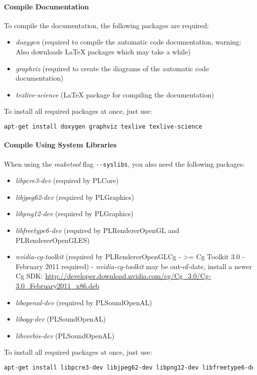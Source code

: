\paragraph{Compile Documentation}
To compile the documentation, the following packages are required:
\begin{itemize}
\item{\emph{doxygen} (required to compile the automatic code documentation, warning: Also downloads \LaTeX{} packages which may take a while)}
\item{\emph{graphviz} (required to create the diagrams of the automatic code documentation)}
\item{\emph{texlive-science} (\LaTeX{} package for compiling the documentation)}
\end{itemize}

To install all required packages at once, just use:
\begin{lstlisting}[language=sh]
apt-get install doxygen graphviz texlive texlive-science
\end{lstlisting}


\paragraph{Compile Using System Libraries}
When using the \emph{maketool} flag \verb+--syslibs+, you also need the following packages:
\begin{itemize}
\item{\emph{libpcre3-dev} (required by PLCore)}
\item{\emph{libjpeg62-dev} (required by PLGraphics)}
\item{\emph{libpng12-dev} (required by PLGraphics)}
\item{\emph{libfreetype6-dev} (required by PLRendererOpenGL and PLRendererOpenGLES)}
\item{\emph{nvidia-cg-toolkit} (required by PLRendererOpenGLCg - >= Cg Toolkit 3.0 - February 2011 required) - \emph{nvidia-cg-toolkit} may be out-of-date, install a newer Cg \ac{SDK}: \url{http://developer.download.nvidia.com/cg/Cg_3.0/Cg-3.0_February2011_x86.deb}}
\item{\emph{libopenal-dev} (required by PLSoundOpenAL)}
\item{\emph{libogg-dev} (PLSoundOpenAL)}
\item{\emph{libvorbis-dev} (PLSoundOpenAL)}
\end{itemize}

To install all required packages at once, just use:
\begin{lstlisting}[language=sh]
apt-get install libpcre3-dev libjpeg62-dev libpng12-dev libfreetype6-dev libopenal-dev libogg-dev libvorbis-dev
\end{lstlisting}





